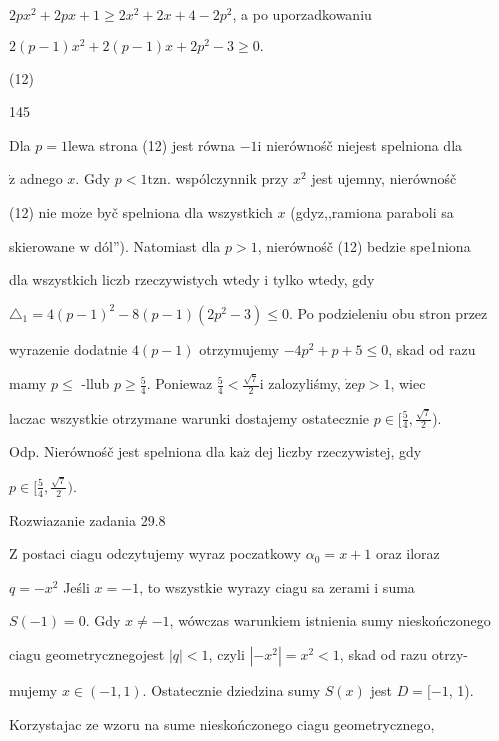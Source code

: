 \documentclass[a4paper,12pt]{article}
\begin{document}
$2px^{2}+2px+1\geq 2x^{2}+2x+4-2p^{2}$, a po uporzadkowaniu

$2(p-1)x^{2}+2(p-1)x+2p^{2}-3\geq 0.$

(12)





145

Dla $p=1$lewa strona (12) jest równa $-1\mathrm{i}$ nierównośč niejest spelniona dla

$\dot{\mathrm{z}}$ adnego $x$. Gdy $p<1\mathrm{t}\mathrm{z}\mathrm{n}$. wspólczynnik przy $x^{2}$ jest ujemny, nierównośč

(12) nie $\mathrm{m}\mathrm{o}\dot{\mathrm{z}}\mathrm{e}$ byč spelniona dla wszystkich $x$ (gdyz,,ramiona paraboli sa

skierowane $\mathrm{w}$ dól''). Natomiast dla $p>1$, nierównośč (12) bedzie spe1niona

dla wszystkich liczb rzeczywistych wtedy $\mathrm{i}$ tylko wtedy, gdy

$\triangle_{1} =4(p-1)^{2}-8(p-1)(2p^{2}-3) \leq 0$. Po podzieleniu obu stron przez

wyrazenie dodatnie $4(p-1)$ otrzymujemy $-4p^{2}+p+5\leq 0$, skad od razu

mamy $ p\leq$ -llub $ p\geq \displaystyle \frac{5}{4}$. Poniewaz $\displaystyle \frac{5}{4}< \displaystyle \frac{\sqrt{7}}{2}\mathrm{i}$ zalozyliśmy, $\dot{\mathrm{z}}\mathrm{e}p>1$, wiec

laczac wszystkie otrzymane warunki dostajemy ostatecznie $ p\in [\displaystyle \frac{5}{4},\frac{\sqrt{7}}{2}$).

Odp. Nierównośč jest spelniona dla $\mathrm{k}\mathrm{a}\dot{\mathrm{z}}$ dej liczby rzeczywistej, gdy

$ p\in [\displaystyle \frac{5}{4},\frac{\sqrt{7}}{2}).$

Rozwiazanie zadania 29.8

$\mathrm{Z}$ postaci ciagu odczytujemy wyraz poczatkowy $\alpha_{0}=x+1$ oraz iloraz

$q = -x^{2}$ Jeśli $x = -1$, to wszystkie wyrazy ciagu sa zerami $\mathrm{i}$ suma

$S(-1)=0$. Gdy $x\neq-1$, wówczas warunkiem istnienia sumy nieskończonego

ciagu geometrycznegojest $|q|<1$, czyli $|-x^{2}|=x^{2}<1$, skad od razu otrzy-

mujemy $x\in(-1,1)$. Ostatecznie dziedzina sumy $S(x)$ jest $D=[-1$, 1).

Korzystajac ze wzoru na sume nieskończonego ciagu geometrycznego,
\end{document}
